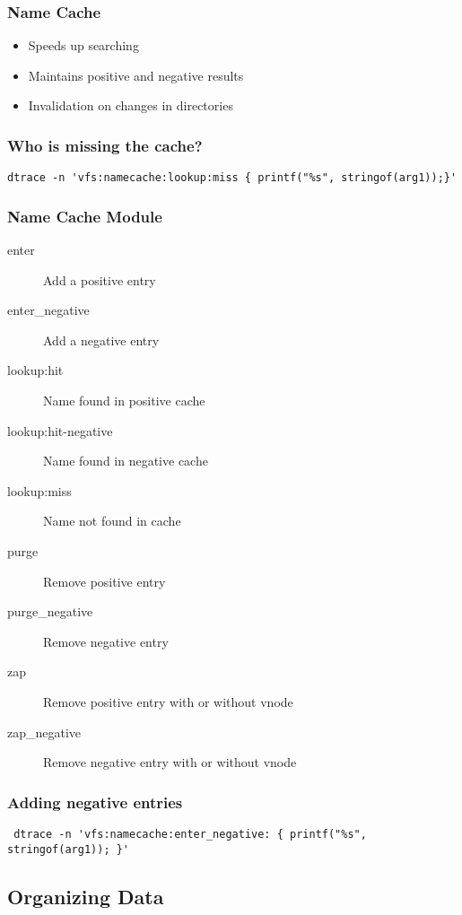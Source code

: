 \begin{frame}
  \frametitle{Name Cache}
  \begin{itemize}
  \item Speeds up searching
  \item Maintains positive and negative results
  \item Invalidation on changes in directories
  \end{itemize}
\end{frame}

\begin{frame}[fragile]
  \frametitle{Who is missing the cache?}
\begin{lstlisting}
dtrace -n 'vfs:namecache:lookup:miss { printf("%s", stringof(arg1));}'
\end{lstlisting}
\end{frame}

\begin{frame}[fragile]
  \frametitle{Name Cache Module}
  \begin{description}
  \item[enter] Add a positive entry
  \item[enter\_negative] Add a negative entry
  \item[lookup:hit] Name found in positive cache
  \item[lookup:hit-negative] Name found in negative cache
  \item[lookup:miss] Name not found in cache
  \item[purge] Remove positive entry
  \item[purge\_negative] Remove negative entry
  \item[zap] Remove positive entry with or without vnode
  \item[zap\_negative] Remove negative entry with or without vnode
  \end{description}
\end{frame}

\begin{frame}[fragile]
  \frametitle{Adding negative entries}
\begin{lstlisting}
 dtrace -n 'vfs:namecache:enter_negative: { printf("%s", stringof(arg1)); }'
\end{lstlisting}
\end{frame}


\subsection{Organizing Data}
\label{sec:organization}

